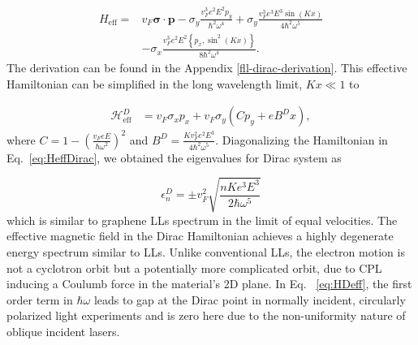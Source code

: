 \documentclass[aps,prb,twocolumn,showpacs,superscriptaddress]{revtex4-2}
\renewcommand{\vec}[1]{\mathbf{#1}}
\newcommand{\ham}{\mathcal{H}}
\begin{document}
\begin{align} \label{eq:HDeff}
  H_{\text{eff}}= &v_{F}\bm{\sigma}\cdot\vec{p}-\sigma_y\frac{v_F^3 e^2 E^2 p_y}{\hbar^{2}\omega^{4}}
  +\sigma_y\frac{v_F^3 e^3 E^{3}\sin{(Kx)}}{4\hbar^{2}\omega^{5}} \nonumber \\
  &-\sigma_x\frac{v_F^3 e^2 E^2 \left\{p_x, \sin^2{(Kx)} \right\} }{8\hbar^{2}\omega^{4}}.
\end{align}
The derivation can be found in the Appendix \ref{fll-dirac-derivation}.
This effective Hamiltonian can be simplified in the long wavelength limit, $Kx \ll 1$ to

\begin{align} \label{eq:HeffDirac}
  \ham_{\text{eff}}^D &= v_{F}\sigma_{x}p_{x}+v_F\sigma_{y} \left( C p_{y} + eB^Dx \right),
\end{align}%
where $C = 1-\left(\tfrac{v_{F}eE}{\hbar\omega^2}\right)^2$ and $B^D=\frac{Kv_F^2 e^2E^3}{4\hbar^{2}\omega^{5}}$.
Diagonalizing the Hamiltonian in Eq.~\eqref{eq:HeffDirac}, we obtained the eigenvalues for Dirac system as%

\begin{equation} \label{eq:DiracEner}
  \epsilon_{n}^D = \pm v_F^2 \sqrt{\dfrac{nK e^3 E^3}{2 \hbar \omega^5}}
\end{equation}
which is similar to graphene LLs spectrum in the limit of equal velocities.
The effective magnetic field in the Dirac Hamiltonian achieves a highly degenerate energy spectrum similar to LLs.
Unlike conventional LLs, the electron motion is not a cyclotron orbit but a potentially more complicated orbit, due to CPL inducing a Coulumb force in the material's 2D plane.
In Eq. ~\eqref{eq:HDeff}, the first order term in $\hbar \omega$ leads to gap at the Dirac point in normally incident, circularly polarized light experiments \cite{YHW, JWM} and is zero here due to the non-uniformity nature of oblique incident lasers.
\end{document}
